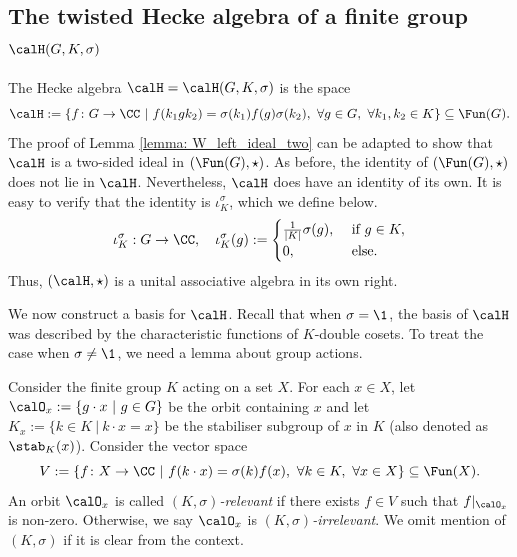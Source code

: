 \documentclass[11pt]{amsart}
\theoremstyle{remark}
\begin{document}
\subsection{The twisted Hecke algebra of a finite group $\calH(G,K,\sigma)$}\label{Section2.2}
The Hecke algebra $\calH = \calH(G,K,\sigma)$ is the space
\[
	\calH := \{f\colon G\to \CC\ |\ f(k_1gk_2) = \sigma(k_1)f(g)\sigma(k_2),\ \forall g\in G,\ \forall k_1,k_2\in K\} \subseteq \Fun(G).
\]
The proof of Lemma \ref{lemma: W_left_ideal_two} can be adapted to show that $\calH$ is a two-sided ideal in $(\Fun(G),\star)$.
As before, the identity of $(\Fun(G),\star)$ does not lie in $\calH$.
Nevertheless, $\calH$ does have an identity of its own.
It is easy to verify that the identity is $\iota_K^\sigma$, which we define below.
\[
	\iota_K^\sigma:G\to\CC,\quad \iota_K^\sigma(g) := \begin{cases}
		\frac{1}{|K|}\sigma(g),\  & \text{if}\ g\in K, \\
		0,\                       & \text{else}.
	\end{cases}
\]
Thus, $(\calH,\star)$ is a unital associative algebra in its own right.

We now construct a basis for $\calH$.
Recall that when $\sigma=\1$, the basis of $\calH$ was described by the characteristic functions of $K$-double cosets.
To treat the case when $\sigma\neq\1$, we need a lemma about group actions.

Consider the finite group $K$ acting on a set $X$.
For each $x\in X$, let $\calO_x := \{g\cdot x\ |\ g\in G\}$ be the orbit containing $x$ and let $K_x := \{k\in K\ |\ k\cdot x = x\}$ be the stabiliser subgroup of $x$ in $K$ (also denoted as $\stab_K(x)$).
Consider the vector space
\[
	V := \{f\colon X\to\CC\ |\ f(k\cdot x) = \sigma(k)f(x),\ \forall k\in K,\ \forall x\in X\}\subseteq \Fun(X).
\]
An orbit $\calO_x$ is called \emph{$(K,\sigma)$-relevant} if there exists $f\in V$ such that $f|_{\calO_x}$ is non-zero.
Otherwise, we say $\calO_x$ is \emph{$(K,\sigma)$-irrelevant}.
We omit mention of $(K,\sigma)$ if it is clear from the context.
\end{document}
